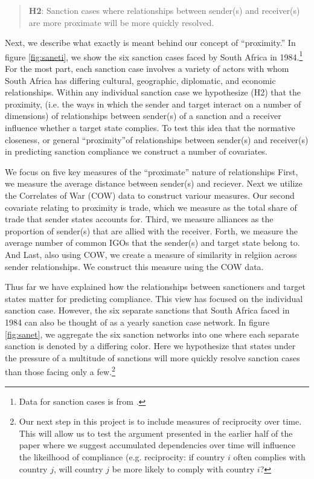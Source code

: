\begin{quote}
	\textbf{H2}: Sanction cases where relationships between sender(s) and receiver(s) are more proximate will be more quickly resolved.
\end{quote}

 Next, we describe what exactly is meant behind our concept of ``proximity.'' In figure \ref{fig:saneti}, we show the six sanction cases faced by South Africa in 1984.\footnote{Data for sanction cases is from \citet{morgan2009threat}.} For the most part, each sanction case involves a variety of actors with whom South Africa has differing cultural, geographic, diplomatic, and economic relationships. Within any individual sanction case we hypothesize (H2) that the proximity, (i.e. the ways in which the sender and target interact on a number of dimensions) of relationships between sender(s) of a sanction and a receiver influence whether a target state complies. To test this idea that the normative closeness, or general ``proximity''of relationships between sender(s) and receiver(s) in predicting sanction compliance we construct a number of covariates. 

We focus on five key measures of the ``proximate'' nature of relationships First, we measure the average distance between sender(s) and reciever. Next we utilize the Correlates of War (COW) data to construct variour measures. Our second covariate relating to proximity is trade, which we measure as the total share of trade that sender states accounts for. Third, we measure alliances as the proportion of sender(s) that are allied with the receiver. Forth, we measure the average number of common IGOs that the sender(s) and target state belong to. And Last, also using COW, we create a measure of similarity in relgiion across sender relationships. We construct this measure using the COW data. 
  
Thus far we have explained how the relationships between sanctioners and target states matter for predicting compliance. This view has focused on the individual sanction case. However, the six separate sanctions that South Africa faced in 1984 can also be thought of as a yearly sanction case network. In figure \ref{fig:sanet}, we aggregate the six sanction networks into one where each separate sanction is denoted by a differing color. Here we hypothesize that states under the pressure of a multitude of sanctions will more quickly resolve sanction cases than those facing only a few.\footnote{Our next step in this project is to include measures of reciprocity over time. This will allow us to test the argument presented in the earlier half of the paper where we suggest accumulated dependencies over time will influence the likeilhood of compliance (e.g. reciprocity: if country $i$ often complies with country $j$, will country $j$ be more likely to comply with country $i$?}

